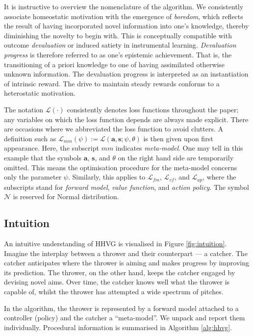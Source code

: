 \documentclass[utf8]{frontiersSCNS}
\newcommand{\bs}{\boldsymbol}
\begin{document}
It is instructive to overview the nomenclature of the algorithm. We consistently associate homeostatic motivation with the emergence of {\it boredom}, which reflects the result of having incorporated novel information into one's knowledge, thereby diminishing the novelty to begin with. This is conceptually compatible with outcome {\it devaluation} or induced satiety in instrumental learning. {\it Devaluation progress} is therefore referred to as one's epistemic achievement. That is, the transitioning of a priori knowledge to one of having assimilated otherwise unknown information. The devaluation progress is interpreted as an instantiation of intrinsic reward. The drive to maintain steady rewards conforms to a heterostatic motivation.

The notation $\mathcal L(\cdot)$ consistently denotes loss functions throughout the paper; any variables on which the loss function depends are always made explicit. There are occasions where we abbreviated the loss function to avoid clutters. A definition such as $\mathcal L_{mm}(\psi) := \mathcal L(\bs a, \bs s; \psi, \theta)$ is then given upon first appearance. Here, the subscript $mm$ indicates {\it meta-model}. One may tell in this example that the symbols $\bs a$, $\bs s$, and $\theta$ on the right hand side are temporarily omitted. This means the optimisation procedure for the meta-model concerns only the parameter $\psi$. Similarly, this applies to $\mathcal L_{fm}$, $\mathcal L_{vf}$, and $\mathcal L_{ap}$, where the subscripts stand for {\it forward model}, {\it value function}, and {\it action policy}. The symbol $\mathcal N$ is reserved for Normal distribution. 


\subsection{Intuition} \label{subsec:intuition}

An intuitive understanding of HHVG is visualised in Figure \ref{fig:intuition}. Imagine the interplay between a thrower and their counterpart --- a catcher. The catcher anticipates where the thrower is aiming and makes progress by improving its prediction. The thrower, on the other hand, keeps the catcher engaged by devising novel aims. Over time, the catcher knows well what the thrower is capable of, whilst the thrower has attempted a wide spectrum of pitches.

In the algorithm, the thrower is represented by a forward model attached to a controller (policy) and the catcher a ``meta-model''. We unpack and report them individually. Procedural information is summarised in Algorithm \ref{alg:hhvg}.
\end{document}
